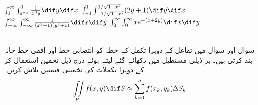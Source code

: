 $\int_1^{\infty}\int_{e^{-x}}^1\frac{1}{x^3y}\dif y\dif x$
$\int_{-1}^1\int_{-1/\sqrt{1-x^2}}^{1/\sqrt{1-x^2}}(2y+1)\dif y\dif x$
$\int_{-\infty}^{\infty}\int_{-\infty}^{\infty}\frac{1}{(x^2+1)(y^2+1)}\dif x\dif y$
$\int_0^{\infty}\int_0^{\infty}xe^{-(x+2y)}\dif x\dif y$

\\
سوال  اور سوال  میں تفاعل   کے  دوہرا تکمل   کے خطہ  کو انتصابی خط  اور افقی خط  خانہ بند کرتی ہیں۔ ہر  ذیلی مستطیل میں دکھائے گئے    لیتے ہوئے  درج  ذیل تخمین استعمال کر کے دوہرا تکملات کی تخمینی قیمتیں تلاش کریں۔
\begin{align*}
\iint\limits_R f(x,y)\dif S\approx \sum\limits_{k=1}^{n}f(x_k,y_k)\Delta S_k
\end{align*}

